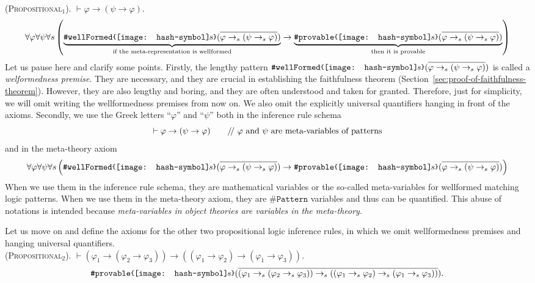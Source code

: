 \documentclass[UTF8,11pt]{article}
\theoremstyle{plain}
\theoremstyle{definition}
\theoremstyle{remark}
\newcommand{\parametric}[2]{{#1}\raisebox{.2ex}{\texttt{\footnotesize{\{}}}#2\raisebox{.2ex}{\texttt{\footnotesize{\}}}}}
\newcommand{\doubleslash}{/\!/{ }}
\newcommand{\shp}{\texttt{[image: hash-symbol]}\kern-0.1em}
\newcommand{\sharpsymbol}{\#}
\newcommand{\shs}{\shp s}
\newcommand{\KPattern}{\texttt{\sharpsymbol Pattern}}
\newcommand{\KwellFormed}{\texttt{\sharpsymbol wellFormed}}
\newcommand{\Kdeduce}{\textup{\texttt{\sharpsymbol provable}}}
\begin{document}
(\textsc{Propositional$_1$}).\quad
$\vdash \varphi \to (\psi \to \varphi)$.
\begin{equation*}
\forall \varphi \forall \psi \forall s \left(
\underbrace{\parametric{\KwellFormed}{\shs}(\overline{\varphi \to_s (\psi 
\to_s  \varphi)})}_\text{if the meta-representation is wellformed}
\to
\underbrace{\parametric{\Kdeduce}{\shs}(\overline{\varphi \to_s (\psi \to_s
\varphi)})}_\text{then it is provable}\right)
\end{equation*}
Let us pause here and clarify some points.
Firstly, the lengthy pattern 
$\parametric{\KwellFormed}{\shs}(\overline{\varphi \to_s (\psi 	\to_s 
\varphi)})$ is called a \emph{welformedness premise}.
They are necessary, and they are crucial in establishing the faithfulness 
theorem (Section~\ref{sec:proof-of-faithfulness-theorem}).
However, they are also lengthy and boring, and they are often understood and 
taken for granted.
Therefore, just for simplicity, we will omit writing the wellformedness 
premises from now on.
We also omit the explicitly universal quantifiers hanging in front of the 
axioms.
Secondly, we use the Greek letters ``$\varphi$'' and ``$\psi$'' both in the 
inference rule schema 
$$\vdash \varphi \to (\psi \to \varphi) \qquad \text{\doubleslash $\varphi$ and 
$\psi$ 
are meta-variables of patterns}$$
and in the meta-theory axiom
$$
\forall \varphi \forall \psi \forall s \left(
\parametric{\KwellFormed}{\shs}(\overline{\varphi \to_s (\psi 
		\to_s  \varphi)})
\to
\parametric{\Kdeduce}{\shs}(\overline{\varphi \to_s (\psi \to_s  
		\varphi)})\right)
$$
When we use them in the inference rule schema, they are mathematical variables 
or the so-called meta-variables for wellformed matching logic patterns.
When we use them in the meta-theory axiom, they are $\KPattern$ variables and 
thus can be quantified.
This abuse of notations is intended because \emph{meta-variables in 
object theories are variables in the meta-theory}.

Let us move on and define the axioms for the other two propositional logic 
inference rules, in which we omit wellformedness premises and hanging universal 
quantifiers.
\\

(\textsc{Propositional$_2$}).\quad
$\vdash (\varphi_1 \to (\varphi_2 \to \varphi_3)) \to ((\varphi_1 \to \varphi_2) \to (\varphi_1 \to \varphi_3))$.
\begin{equation*}
\parametric{\Kdeduce}{\shs}(
\overline{(\varphi_1 \to_s (\varphi_2 \to_s \varphi_3)) \to_s ((\varphi_1 \to_s 
\varphi_2) \to_s (\varphi_1 \to_s \varphi_3))}).
\end{equation*}
\end{document}
